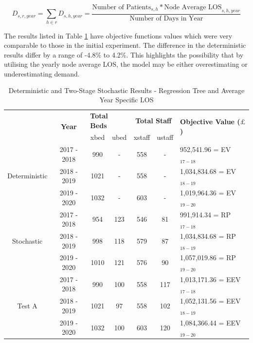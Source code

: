 \documentclass[../thesis.tex]{subfiles}
\begin{document}
\begin{equation}\label{eq:treedemand3}
        D_{s,r,year} = \sum\limits_{h \in r} D_{s,h,year} = \frac{\text{Number of Patients}_{s,h}*\text{Node Average LOS}_{s,h,year}}{\text{Number of Days in Year}}
\end{equation}

The results listed in Table \ref{tab:Results3} have objective functions values which were very comparable to those in the initial experiment. The difference in the deterministic results differ by a range of -4.8\% to 4.2\%. This highlights the possibility that by utilising the yearly node average LOS, the model may be either overestimating or underestimating demand.

\begin{table}[h!]
    \centering
    \begin{tabular}{ccccccl}\toprule
 & \multirow{2}{*}{\textbf{Year}}& \multicolumn{2}{l}{\textbf{Total Beds}} & \multicolumn{2}{c}{\textbf{Total Staff}} & \multirow{2}{*}{\textbf{Objective Value ($\pounds$)}}\\ \cmidrule(lr){3-4} \cmidrule(lr){5-6}
&& xbed           & ubed          & xstaff         & ustaff         \\ \midrule
     \multirow{3}{*}{Deterministic} & 2017 - 2018 & 990 & - &  558 & - & 952,541.96 =  EV$_{17-18}$ \\ 
      & 2018 - 2019 & 1021 & - & 558 &  - &  1,034,834.68 = EV$_{18-19}$ \\
      & 2019 - 2020 & 1032 & - & 603 & - &  1,019,964.36 = EV$_{19-20}$\\ \midrule
     \multirow{3}{*}{Stochastic} & 2017 - 2018 & 954 &  123 & 546 &  81&  991,914.34 = RP$_{17-18}$ \\ 
      & 2018 - 2019 & 998 &  118 & 579& 87 & 1,034,834.68 = RP$_{18-19}$ \\
      & 2019 - 2020 & 1010 & 121 & 576 & 90 & 1,057,019.86 = RP$_{19-20}$\\ \midrule    
     \multirow{3}{*}{Test A} & 2017 - 2018 & 990  & 100 & 558  & 117 & 1,013,171.36 = EEV$_{17-18}$ \\ 
      & 2018 - 2019& 1021 & 97 & 558  & 102 & 1,052,131.56 = EEV$_{18-19}$ \\
      & 2019 - 2020 & 1032 & 100& 603 & 120& 1,084,366.44 = EEV$_{19-20}$\\ \bottomrule       
    \end{tabular}
    \caption{Deterministic and Two-Stage Stochastic Results - Regression Tree and Average Year Specific LOS}
    \label{tab:Results3}
\end{table}
\end{document}
